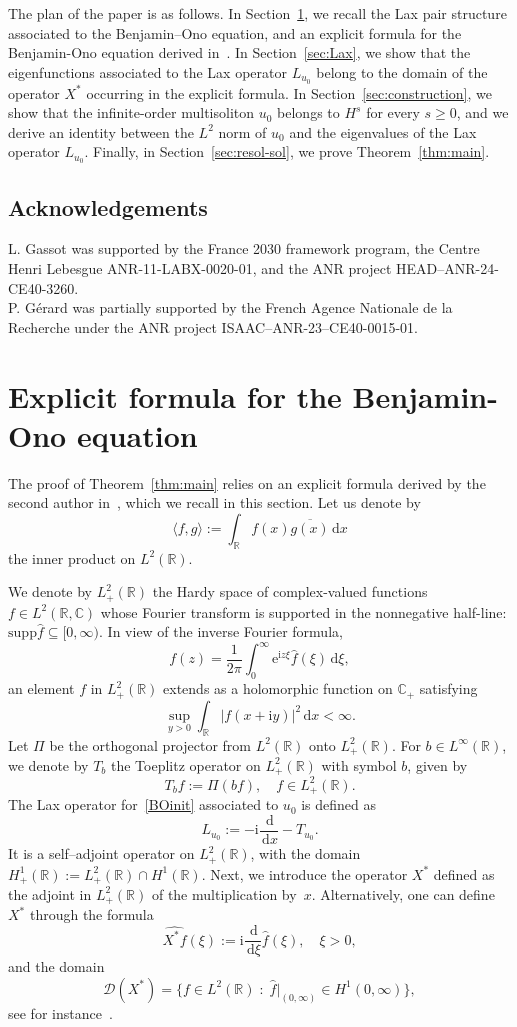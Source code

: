 \documentclass[english, 12pt]{amsart}%
\newcommand{\R}{\mathbb{R}}
\newcommand{\C}{\mathbb{C}}
\newcommand{\ii}{\mathrm{i}}
\newcommand{\dd}{\,\mathrm{d}}
\numberwithin{equation}{section}
\begin{document}
The  plan of the paper is as follows.
In Section~\ref{sec:notation}, we recall the Lax pair structure associated to the Benjamin--Ono equation, and an explicit formula for the Benjamin-Ono equation derived in~\cite{Gerard22}. In Section~\ref{sec:Lax}, we show that the eigenfunctions associated to the Lax operator $L_{u_0}$ belong to the domain of the  operator  $X^*$ occurring  in the explicit formula. In Section~\ref{sec:construction}, we show that the infinite-order multisoliton $u_0$ belongs to $H^s$ for every $s\geq 0$, and we derive an identity between the $L^2$ norm of $u_0$ and the eigenvalues of the Lax operator $L_{u_0}$. Finally, in Section~\ref{sec:resol-sol}, we prove Theorem~\ref{thm:main}.




\subsection*{Acknowledgements}
L. Gassot was supported by the France 2030 framework program, the Centre Henri Lebesgue ANR-11-LABX-0020-01, and the ANR project HEAD--ANR-24-CE40-3260.\\
P. G\'erard was partially supported by the French Agence Nationale de la Recherche under the ANR project ISAAC--ANR-23--CE40-0015-01.\\




\section{Explicit formula for the Benjamin-Ono equation}\label{sec:notation}


The proof of Theorem~\ref{thm:main} relies on an explicit formula derived by the second author in~\cite{Gerard22}, which we recall in this section. Let us denote by \[\langle f,g\rangle:=\int_{\R}f(x)\overline{g(x)}\dd x\] the inner product on $L^2(\R)$.


We denote by $L^2_+(\R)$ the Hardy space  of complex-valued functions $f\in L^2(\R,\C)$ whose Fourier transform is supported in the nonnegative half-line: $\mathrm{supp}\widehat{f}\subseteq [0,\infty)$.
In view of the inverse Fourier formula,
\[ f(z)=\frac{1}{2\pi}\int_0^\infty {\mathrm{e}}^{\ii z\xi}\widehat f(\xi)\dd\xi,\]
an element $f$ in $L^2_+(\R)$ extends as a holomorphic function on $\C_+$ satisfying
\[
\sup_{y>0}\int_{\R}|f(x+\ii y)|^2\dd x<\infty.
\]
Let $\Pi$ be the orthogonal projector from $L^2(\R)$ onto $L^2_+(\R)$. For $b\in L^{\infty}(\R)$, we denote by $T_b$ the Toeplitz operator on $L^2_+(\R)$ with symbol $b$, given by
\[
T_bf:=\Pi(bf),
\quad f\in L^2_+(\R).
\]
The Lax operator for~\eqref{BOinit} associated to $u_0$ is defined as 
\[
L_{u_0}:=-\ii\frac{\dd }{\dd x}-T_{u_0}.
\]
It is a self--adjoint operator on $L^2_+(\R)$, with the domain $H^1_+(\R):=L^2_+(\R)\cap H^1(\R)$. 
Next, we introduce the operator $X^*$ defined as the adjoint in $L^2_+(\R)$ of the multiplication by~$x$. Alternatively, one can define $X^*$ through the formula
\[
\widehat{X^*f}(\xi):=\ii\frac{\dd }{\dd \xi}\widehat{f}(\xi),
\quad \xi>0,
\]
and the domain
\[
\mathcal{D}(X^*)=\{f\in L^2(\R) \;\colon\; \widehat{f}|_{(0,\infty)}\in H^1(0,\infty)\},
\]
see for instance~\cite{Gerard26}.
\end{document}
